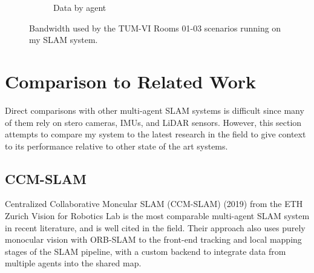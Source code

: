 \begin{figure}[h]
\begin{subfigure}[b]{0.45\linewidth}
        \caption{Data by agent}
    \end{subfigure}%

    \caption{Bandwidth used by the TUM-VI Rooms 01-03 scenarios running on my SLAM system.}
    \label{fig:euroc-mh-01-02-bandwith}
\end{figure}


\section{Comparison to Related Work}
\label{sec:comparison-to-related-work}

Direct comparisons with other multi-agent SLAM systems is difficult since many of them rely on stero cameras, IMUs, and LiDAR sensors. However, this section attempts to compare my system to the latest research in the field to give context to its performance relative to other state of the art systems.

\subsection{CCM-SLAM}
\label{sec:ccm-slam}
Centralized Collaborative Moncular SLAM (CCM-SLAM) (2019) from the ETH Zurich Vision for Robotics Lab \autocite{schmuck2019ccm} is the most comparable multi-agent SLAM system in recent literature, and is well cited in the field. Their approach also uses purely monocular vision with ORB-SLAM to the front-end tracking and local mapping stages of the SLAM pipeline, with a custom backend to integrate data from multiple agents into the shared map.

